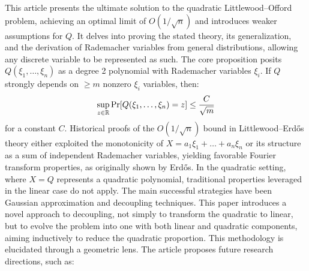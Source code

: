 This article presents the ultimate solution to the quadratic Littlewood–Offord problem, achieving an optimal limit of $O(1/\sqrt{n})$ and introduces weaker assumptions for $Q$. It delves into proving the stated theory, its generalization, and the derivation of Rademacher variables from general distributions, allowing any discrete variable to be represented as such.
The core proposition posits $Q(\xi_1,\ldots,\xi_n)$ as a degree 2 polynomial with Rademacher variables $\xi_i$. If $Q$ strongly depends on $\geq m$ nonzero $\xi_i$ variables, then:
\vspace{-0.36\baselineskip}
\[ \sup_{z\in\mathbb{R}} \Pr[Q(\xi_1,\ldots,\xi_n) = z] \leq \frac{C}{\sqrt{m}} \vspace{-0.5\baselineskip} \]
for a constant $C$.
Historical proofs of the $O(1/\sqrt{n})$ bound in Littlewood–Erdős theory either exploited the monotonicity of $X = a_1\xi_1 + \ldots + a_n\xi_n$ or its structure as a sum of independent Rademacher variables, yielding favorable Fourier transform properties, as originally shown by Erdős.
In the quadratic setting, where $X = Q$ represents a quadratic polynomial, traditional properties leveraged in the linear case do not apply. The main successful strategies have been Gaussian approximation and decoupling techniques.
This paper introduces a novel approach to decoupling, not simply to transform the quadratic to linear, but to evolve the problem into one with both linear and quadratic components, aiming inductively to reduce the quadratic proportion. This methodology is elucidated through a geometric lens.
The article proposes future research directions, such as:
